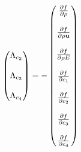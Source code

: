\documentclass[a4paper]{article}
\begin{document}
\begin{landscape}
\begin{huge}
\begin{equation}
\begin{pmatrix}
      \Lambda_{c_2} \\ \\
      \Lambda_{c_3} \\ \\
      \Lambda_{c_4}
    \end{pmatrix}
    = -
    \begin{pmatrix}
      \frac{\partial f}{\partial \rho} \\ \\
      \frac{\partial f}{\partial \rho \mathbf u} \\ \\
      \frac{\partial f}{\partial \rho E} \\ \\
      \frac{\partial f}{\partial c_1} \\ \\
      \frac{\partial f}{\partial c_2} \\ \\
      \frac{\partial f}{\partial c_3} \\ \\
      \frac{\partial f}{\partial c_4}
    \end{pmatrix}
    \label{full-trans-adjoint}
  \end{equation}


\end{huge}
\end{landscape}
\end{document}
